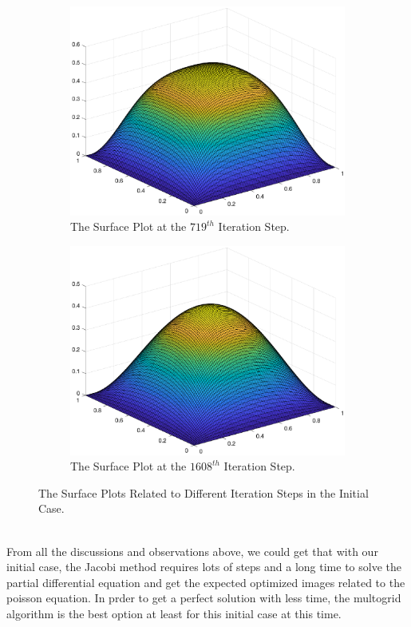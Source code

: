\documentclass [a4paper, 12pt]{article}
\begin{document}
\begin {figure} [h!]
\begin {subfigure} [b] {0.3\linewidth}
      \includegraphics [width=\linewidth] {719.eps}
      \caption {The Surface Plot at the $719^{th}$ Iteration Step.}
\end {subfigure}
\begin {subfigure} [b] {0.3\linewidth}
      \includegraphics [width=\linewidth] {1608.eps}
      \caption {The Surface Plot at the $1608^{th}$ Iteration Step.}
\end {subfigure}
\caption {The Surface Plots Related to Different Iteration Steps in the Initial Case.}
\label {fig: surface}
\end {figure}
\\From all the discussions and observations above, we could get that with our initial case, the Jacobi method requires lots of steps and a long time to solve the partial differential equation and get the expected optimized images related to the poisson equation. In prder to get a perfect solution with less time, the multogrid algorithm is the best option at least for this initial case at this time.
\end{document}

